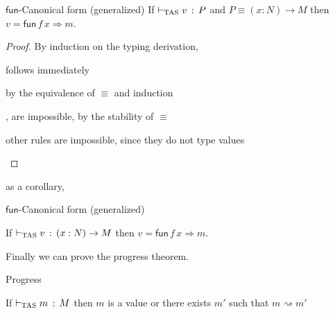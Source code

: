 \begin{lem}
 $\mathsf{fun}$-Canonical form (generalized)
 If $\vdash_{\mathrm{TAS}} v\,:\,P$ and $P\equiv\left(x:N\right)\rightarrow M$ then $v=\mathsf{fun}\,f\,x\Rightarrow m$.
\end{lem}
\begin{proof}
By induction on the typing derivation,
 
\begin{casenv}
\item {} follows immediately
\item {} by the equivalence of $\equiv$ and induction
\item {},  are impossible, by the stability of $\equiv$
\item other rules  are impossible, since they do not type values
\end{casenv}
\end{proof}
as a corollary,
\begin{cor}
$\mathsf{fun}$-Canonical form (generalized)
 
If $\vdash_{\mathrm{TAS}} v\,:\,\left(x:N\right)\rightarrow M$ then \textup{$v=\mathsf{fun}\,f\,x\Rightarrow m$.}
\end{cor}
 
 
Finally we can prove the progress theorem.
\begin{thm}
Progress
 
If $\vdash_{\mathrm{TAS}} m\,:\,M$ then $m$ is a value or there exists $m'$ such that $m\rightsquigarrow m'$
\end{thm}
 
